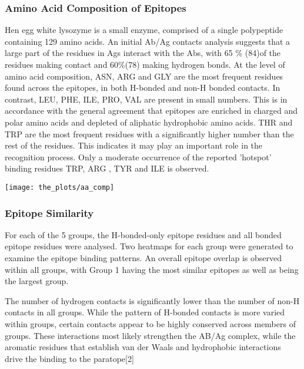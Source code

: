 \documentclass{article}
\begin{document}
\subsubsection{Amino Acid Composition of Epitopes}
Hen egg white lysozyme is a small enzyme, comprised of a single polypeptide containing 129 amino acids. An initial Ab/Ag contacts analysis suggests that a large part of the residues in Ags interact with the Abs, with  65 \% (84)of the residues making contact and 60\%(78) making hydrogen bonds. At the level of amino acid composition, ASN, ARG and GLY are the most frequent residues found across the epitopes, in both H-bonded and non-H bonded contacts. In contrast, LEU, PHE, ILE, PRO, VAL are present in small numbers. This is in accordance with the general agreement that epitopes are enriched in charged and polar amino acids
and depleted of aliphatic hydrophobic amino acids\cite{13KrNiPa}. THR and TRP are the most frequent residues with a significantly higher number than the rest of the residues. This indicates it may play an important role in the recognition process. Only a moderate occurrence of the reported 'hotspot' binding residues TRP, ARG , TYR and ILE \cite{Bogan1998} is observed.


\begin{center}
	\texttt{[image: the\_plots/aa\_comp]}
	 \label{pix:epitopeaadistr} %
\end{center}
\bigbreak


\subsubsection{Epitope Similarity}
For each of the 5 groups, the H-bonded-only epitope residues and all bonded epitope residues were analysed. Two heatmaps for each group were generated to examine the epitope binding patterns. An overall epitope overlap is observed within all groups, with Group 1 having the most similar epitopes as well as being the largest group. 

The number of hydrogen contacts is significantly lower than the number of non-H contacts in all groups. While the pattern of H-bonded contacts is more varied within groups, certain contacts appear to be highly conserved across members of groups. These interactions most likely strengthen the AB/Ag complex, while the aromatic residues that establish van der Waals and hydrophobic interactions drive the binding to the paratope[2]
\end{document}
